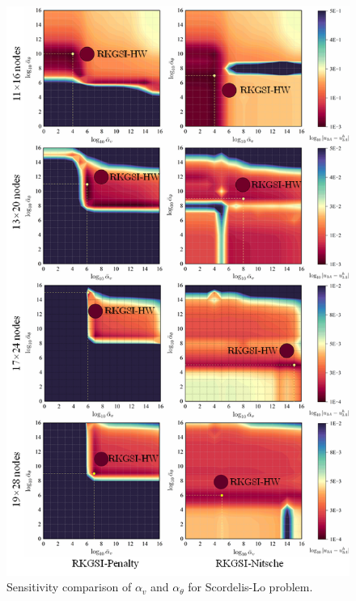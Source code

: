 \begin{figure}[!ht]
\centering
\includegraphics[width=\textwidth]{figures/sla_r1}
\caption{Sensitivity comparison of $\alpha_v$ and $\alpha_\theta$ for Scordelis-Lo problem.}\label{slf3}
\end{figure}
